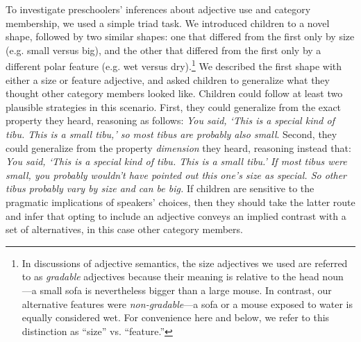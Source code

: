 \documentclass[man]{apa2}
\begin{document}
To investigate preschoolers' inferences about adjective use and category membership, we used a simple triad task.  We introduced children to a novel shape, followed by two similar shapes: one that differed from the first only by size (e.g. small versus big), and the other that differed from the first only by a different polar feature (e.g. wet versus dry).\footnote{In discussions of adjective semantics, the size adjectives we used are referred to as \emph{gradable} adjectives because their meaning is relative to the head noun \cite{kennedy2012}---a small sofa is nevertheless bigger than a large mouse. In contrast, our alternative features were \emph{non-gradable}---a sofa or a mouse exposed to water is equally considered wet. For convenience here and below, we refer to this distinction as ``size'' vs. ``feature.''} We described the first shape with either a size or feature adjective, and asked children to generalize what they thought other category members looked like. Children could follow at least two plausible strategies in this scenario. First, they could generalize from the exact property they heard, reasoning as follows: \emph{You said, `This is a special kind of tibu. This is a small tibu,' so most tibus are probably also small}. Second, they could generalize from the property \emph{dimension} they heard, reasoning instead that: \emph{You said, `This is a special kind of tibu. This is a small tibu.' If most tibus were small, you probably wouldn't have pointed out this one's size as special. So other tibus probably vary by size and can be big.} If children are sensitive to the pragmatic implications of speakers' choices, then they should take the latter route and infer that opting to include an adjective conveys an implied contrast with a set of alternatives, in this case other category members. 


\end{document}
